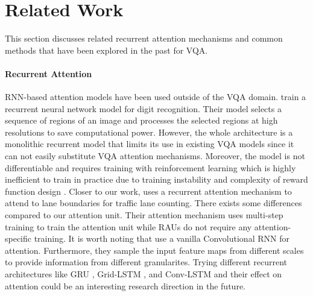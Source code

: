 \documentclass[times,twocolumn, final ,authoryear]{elsarticle}
\begin{document}
  
  \section{Related Work}
  This section discusses related recurrent attention mechanisms and common methods that have been explored in the past for VQA.
  
  	\paragraph{Recurrent Attention}
  	\ac{RNN}-based attention models have been used outside of the VQA domain.
  	\cite{mnih2014} train a recurrent neural network model for digit recognition. Their model selects a
  	sequence of regions of an image and processes the selected regions at high
  	resolutions to save computational power. However, the whole architecture is a monolithic
  	recurrent model that limits its use in existing VQA models since it can not easily substitute VQA attention mechanisms. Moreover, the model
  	is not differentiable and requires training with reinforcement learning which is highly inefficient to train in
  	practice due to training instability \citep{lanctot2017} and complexity of reward function
  	design \citep{paulus2017}.
  	Closer to our work, \cite{homayounfar2018} uses a recurrent attention mechanism to attend to lane boundaries for traffic lane counting. There exists some differences compared to our attention unit. Their attention mechanism uses multi-step training to train
  	the attention unit while \acp{RAU} do not require any attention-specific training. It is worth noting that \cite{homayounfar2018} use a vanilla Convolutional RNN for attention. Furthermore, they sample the input feature maps from different scales to provide information from different granularites. Trying different recurrent architectures like GRU \citep{cho2014a},
  	Grid-LSTM \citep{kalchbrenner2015}, and Conv-LSTM \citep{shi2015} and their effect on attention could be an interesting research direction in the future.
  
  
  
\end{document}
